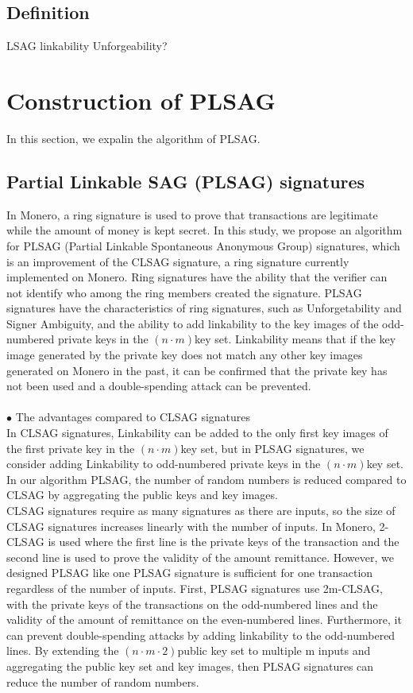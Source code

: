 \documentclass[letterpaper,10pt]{article}
\begin{document}
\subsection{Definition}
LSAG
linkability
Unforgeability?
\section{Construction of PLSAG}
In this section, we expalin the algorithm of PLSAG.
\subsection{Partial Linkable SAG (PLSAG) signatures}
In Monero, a ring signature is used to prove that transactions are legitimate while the amount of money is kept secret.
In this study, we propose an algorithm for PLSAG (Partial Linkable Spontaneous Anonymous Group) signatures,
which is an improvement of the CLSAG signature, a ring signature currently implemented on Monero.
Ring signatures have the ability that the verifier can not identify who among the ring members created the signature.
PLSAG signatures have the characteristics of ring signatures, such as Unforgetability and Signer Ambiguity,
and the ability to add linkability to the key images of the odd-numbered private keys in the $(n\cdot m)$key set.
Linkability means that if the key image generated by the private key does not match any other key images generated on Monero in the past,
it can be confirmed that the private key has not been used and a double-spending attack can be prevented.\\
\\
$\bullet $ The advantages compared to CLSAG signatures\\
\quad In CLSAG signatures, Linkability can be added to the only first key images of the first private key in the $(n\cdot m)$key set,
but in PLSAG signatures, we consider adding Linkability to odd-numbered private keys in the $(n\cdot m)$key set.
In our algorithm PLSAG, the number of random numbers is reduced compared to CLSAG by aggregating the public keys and key images.\\
\quad CLSAG signatures require as many signatures as there are inputs,
so the size of CLSAG signatures increases linearly with the number of inputs.
In Monero, 2-CLSAG is used where the first line is the private keys of the transaction
and the second line is used to prove the validity of the amount remittance.
However, we designed PLSAG like one PLSAG signature is sufficient for one transaction regardless of the number of inputs.
First, PLSAG signatures use 2m-CLSAG, with the private keys of the transactions on the odd-numbered lines
and the validity of the amount of remittance on the even-numbered lines.
Furthermore, it can prevent double-spending attacks by adding linkability to the odd-numbered lines.
By extending the $(n\cdot m \cdot 2)$public key set to multiple m inputs and aggregating the public key set and key images,
then PLSAG signatures can reduce the number of random numbers.
\end{document}

